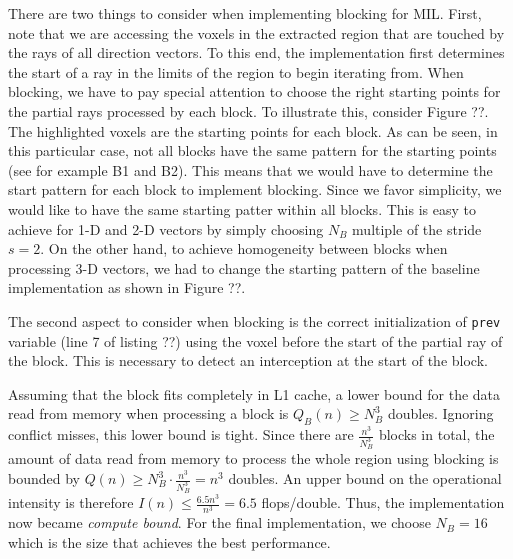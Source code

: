 \documentclass[letterpaper]{article}
\begin{document}
There are two things to consider when implementing blocking for MIL. First, note that we are accessing the voxels in the extracted region that are touched by the rays of all direction vectors. To this end, the implementation first determines the start of a ray in the limits of the region to begin iterating from. When blocking, we have to pay special attention to choose the right starting points for the partial rays processed by each block. To illustrate this, consider Figure ??. The highlighted voxels are the starting points for each block. As can be seen, in this particular case, not all blocks have the same pattern for the starting points (see for example B1 and B2). This means that we would have to determine the start pattern for each block to implement blocking. Since we favor simplicity, we would like to have the same starting patter within all blocks. This is easy to achieve for 1-D and 2-D vectors by simply choosing $N_B$ multiple of the stride $s=2$. On the other hand, to achieve homogeneity between blocks when processing 3-D vectors, we had to change the starting pattern of the baseline implementation as shown in Figure ??.

The second aspect to consider when blocking is the correct initialization of \texttt{prev} variable (line 7 of listing ??) using the voxel before the start of the partial ray of the block. This is necessary to detect an interception at the start of the block. 

Assuming that the block fits completely in L1 cache, a lower bound for the data read from memory when processing a block is $Q_B(n) \geq N_B^3$ doubles. Ignoring conflict misses, this lower bound is tight. Since there are $\frac{n^3}{N_B^3}$ blocks in total, the amount of data read from memory to process the whole region using blocking is bounded by $Q(n) \geq N_B^3 \cdot \frac{n^3}{N_B^3} = n^3$ doubles. An upper bound on the operational intensity is therefore $I(n) \leq \frac{6.5n^3}{n^3} = 6.5$ flops/double. Thus, the implementation now became \textit{compute bound}. For the final implementation, we choose $N_B = 16$ which is the size that achieves the best performance.
\end{document}
